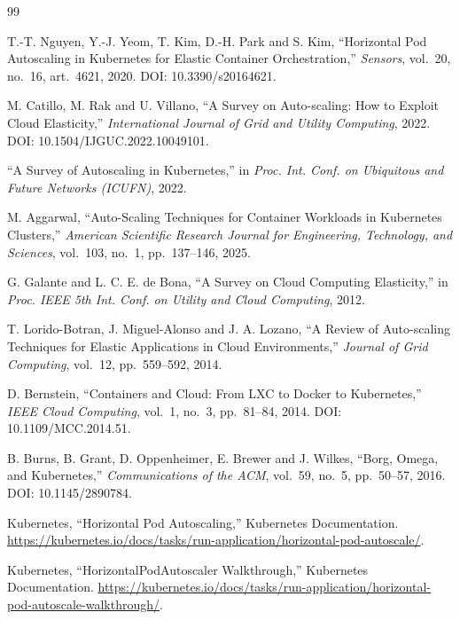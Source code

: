 \documentclass[conference]{IEEEtran}
\begin{document}
\begin{thebibliography}{99}

T.-T. Nguyen, Y.-J. Yeom, T. Kim, D.-H. Park and S. Kim, ``Horizontal Pod
Autoscaling in Kubernetes for Elastic Container Orchestration,'' \textit{Sensors},
vol.~20, no.~16, art.~4621, 2020. DOI: 10.3390/s20164621.

M. Catillo, M. Rak and U. Villano, ``A Survey on Auto-scaling: How to Exploit
Cloud Elasticity,'' \textit{International Journal of Grid and Utility Computing},
2022. DOI: 10.1504/IJGUC.2022.10049101.

``A Survey of Autoscaling in Kubernetes,'' in \textit{Proc. Int. Conf. on
Ubiquitous and Future Networks (ICUFN)}, 2022.

M. Aggarwal, ``Auto-Scaling Techniques for Container Workloads in Kubernetes
Clusters,'' \textit{American Scientific Research Journal for Engineering,
Technology, and Sciences}, vol.~103, no.~1, pp.~137--146, 2025.

G. Galante and L. C. E. de Bona, ``A Survey on Cloud Computing Elasticity,'' in
\textit{Proc. IEEE 5th Int. Conf. on Utility and Cloud Computing}, 2012.

T. Lorido-Botran, J. Miguel-Alonso and J. A. Lozano, ``A Review of Auto-scaling
Techniques for Elastic Applications in Cloud Environments,'' \textit{Journal of
Grid Computing}, vol.~12, pp.~559--592, 2014.

D. Bernstein, ``Containers and Cloud: From LXC to Docker to Kubernetes,''
\textit{IEEE Cloud Computing}, vol.~1, no.~3, pp.~81--84, 2014. DOI:
10.1109/MCC.2014.51.

B. Burns, B. Grant, D. Oppenheimer, E. Brewer and J. Wilkes, ``Borg, Omega, and
Kubernetes,'' \textit{Communications of the ACM}, vol.~59, no.~5, pp.~50--57,
2016. DOI: 10.1145/2890784.

Kubernetes, ``Horizontal Pod Autoscaling,'' Kubernetes Documentation.
\url{https://kubernetes.io/docs/tasks/run-application/horizontal-pod-autoscale/}.

Kubernetes, ``HorizontalPodAutoscaler Walkthrough,'' Kubernetes Documentation.
\url{https://kubernetes.io/docs/tasks/run-application/horizontal-pod-autoscale-walkthrough/}.


\end{thebibliography}
\end{document}
